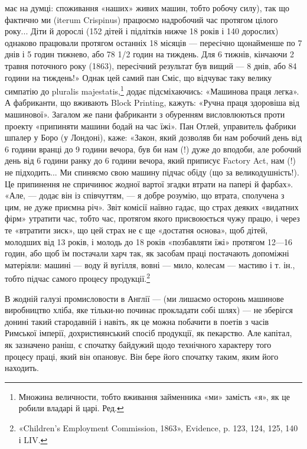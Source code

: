 \parcont{}  %
має на думці: споживання «наших» живих машин, тобто робочу
силу), так що фактично ми (iterum Crispinus) працюємо надробочий
час протягом цілого року... Діти й дорослі (152 дітей і
підлітків нижче 18 років і 140 дорослих) однаково працювали
протягом останніх 18 місяців — пересічно щонайменше по 7 днів
і 5 годин тижнево, або 78 1/2 годин на тиждень. Для 6 тижнів,
кінчаючи 2 травня поточного року (1863), пересічний результат
був вищий — 8 днів, або 84 години на тиждень!» Однак  цей самий
пан Сміс, що відчуває таку велику симпатію до pluralis majestatis,\footnote*{
Множина величности, тобто вживання займенника «ми» замість
«я», як це робили владарі й царі. Ред.
}
додає підсміхаючись: «Машинова праця легка». А фабриканти,
що вживають Block Printing, кажуть: «Ручна праця
здоровіша від машинової». Загалом же пани фабриканти з обуренням
висловлюються проти проекту «припиняти машини бодай
на час їжі». Пан Отлей, управитель фабрики шпалер у Боро
(у Лондоні), каже: «Закон, який дозволяв би нам робочий день
від 6 години вранці до 9 години вечора, був би нам (!) дуже до вподоби,
але робочий день від 6 години ранку до 6 години вечора,
який приписує Factory Act, нам (!) не підходить... Ми спиняємо
свою машину підчас обіду (що за великодушність!). Це припинення
не спричинює жодної вартої згадки втрати на папері й фарбах».
«Але, — додає він із співчуттям, — я добре розумію, що втрата,
сполучена з цим, не дуже приємна річ». Звіт комісії наївно гадає,
що страх деяких «видатних фірм» утратити час, тобто час, протягом
якого присвоюється чужу працю, і через те «втратити зиск»,
що цей страх не є ще «достатня основа», щоб дітей, молодших
від 13 років, і молодь до 18 років «позбавляти їжі» протягом
12—16 годин, або щоб їм постачали харч так, як засобам праці
постачають допоміжні матеріяли: машині — воду й вугілля,
вовні — мило, колесам — мастиво і т. ін., тобто підчас самого
процесу продукції.\footnote{
«Children’s Employment Commission, 1863», Evidence, p. 123,
124, 125, 140 і LIV.
}

В жодній галузі промисловости в Англії — (ми лишаємо осторонь
машинове виробництво хліба, яке тільки-но починає прокладати
собі шлях) — не зберігся донині такий стародавній
і навіть, як це можна побачити в поетів з часів Римської імперії,
дохристиянський спосіб продукції, як пекарство. Але капітал,
як зазначено раніш, є спочатку байдужий щодо технічного характеру
того процесу праці, який він опановує. Він бере його
спочатку таким, яким його находить.

